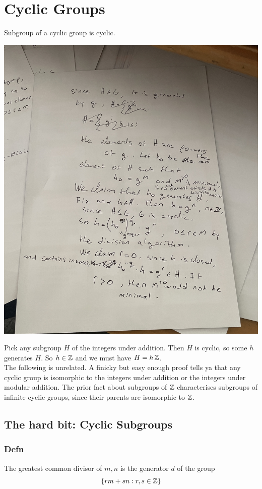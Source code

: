\section*{Cyclic Groups}
Subgroup of a cyclic group is cyclic.
\begin{center}
\includegraphics[scale=0.1, angle=-90]{fig/IMG_7322.jpeg}
\end{center}
Pick any subgroup $H$ of the integers under addition. Then $H$ is cyclic, so some $h$ generates $H$. So $h \in \operatorname{\mathbb{Z}}$ and we must have $H = h \operatorname{\mathbb{Z}}$. \\ \newline
The following is unrelated. A finicky but easy enough proof tells ya that any cyclic group is isomorphic to the integers under addition or the integers under modular addition.
The prior fact about subgroups of $\operatorname{\mathbb{Z}}$ characterises subgroups of infinite cyclic groups, since their parents are isomorphic to $\operatorname{\mathbb{Z}}$.
\subsection*{The hard bit: Cyclic Subgroups}
\subsubsection*{Defn}
The greatest common divisor of $m,n$ is the generator $d$ of the group $$
\{rm+sn:r,s \in \operatorname{\mathbb{Z}}\}
$$
